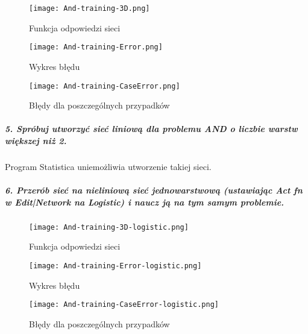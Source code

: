 \documentclass{article}
\begin{document}
\begin{figure}[H]
\begin{center}
\texttt{[image: And-training-3D.png]}
\end{center}
\caption{Funkcja odpowiedzi sieci}
\label{fig-1Tdelta}
\end{figure}

\begin{figure}[H]
\begin{center}
\texttt{[image: And-training-Error.png]}
\end{center}
\caption{Wykres błędu}
\label{fig-1Tdelta}
\end{figure}

\begin{figure}[H]
\begin{center}
\texttt{[image: And-training-CaseError.png]}
\end{center}
\caption{Błędy dla poszczególnych przypadków}
\label{fig-1Tdelta}
\end{figure}
 
\subparagraph{5. Spróbuj utworzyć sieć liniową dla problemu AND o liczbie warstw większej niż 2.\\}
Program Statistica uniemożliwia utworzenie takiej sieci.

\subparagraph{6. Przerób sieć na nieliniową sieć jednowarstwową (ustawiając Act fn w Edit|Network na Logistic) i naucz ją na tym samym problemie.}

\begin{figure}[H]
\begin{center}
\texttt{[image: And-training-3D-logistic.png]}
\end{center}
\caption{Funkcja odpowiedzi sieci}
\label{fig-1Tdelta}
\end{figure}

\begin{figure}[H]
\begin{center}
\texttt{[image: And-training-Error-logistic.png]}
\end{center}
\caption{Wykres błędu}
\label{fig-1Tdelta}
\end{figure}

\begin{figure}[H]
\begin{center}
\texttt{[image: And-training-CaseError-logistic.png]}
\end{center}
\caption{Błędy dla poszczególnych przypadków}
\label{fig-1Tdelta}
\end{figure}
\end{document}
